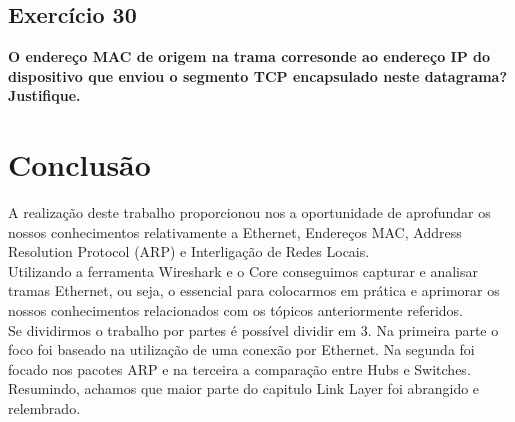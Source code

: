 \documentclass[a4paper]{report}
\begin{document}
\section{Exercício 30}
\textbf{O endereço MAC de origem na trama corresonde ao endereço IP do
    dispositivo que enviou o segmento TCP encapsulado neste datagrama?
    Justifique.}\\

\chapter{Conclusão}
A realização deste trabalho proporcionou nos a oportunidade de aprofundar os
nossos conhecimentos relativamente a Ethernet, Endereços MAC, Address Resolution
Protocol (ARP) e Interligação de Redes Locais.\\
Utilizando a ferramenta Wireshark e o Core conseguimos capturar e analisar
tramas Ethernet, ou seja, o essencial para colocarmos em prática e aprimorar os
nossos conhecimentos relacionados com os tópicos anteriormente referidos.\\
Se dividirmos o trabalho por partes é possível dividir em 3. Na primeira parte o
foco foi baseado na utilização de uma conexão por Ethernet. Na segunda foi
focado nos pacotes ARP e na terceira a comparação entre Hubs e Switches.
Resumindo, achamos que maior parte do capitulo Link Layer foi abrangido e
relembrado.
\end{document}
